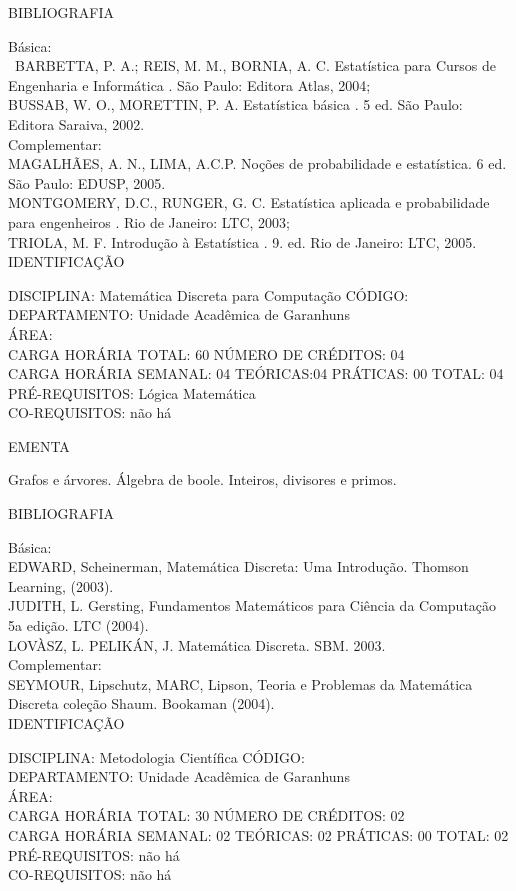 \documentclass[
	12pt,				%
	openright,			%
  oneside,     %
	a4paper,			%
	chapter=TITLE,		%
	english,			%
	french,				%
	spanish,			%
	brazil				%
	]{abntex2}
\begin{document}
\begin{apendicesenv}
BIBLIOGRAFIA 

Básica:\\\
BARBETTA, P. A.; REIS, M. M., BORNIA, A. C. Estatística para Cursos de Engenharia e Informática . São Paulo: Editora Atlas, 2004;\\
BUSSAB, W. O., MORETTIN, P. A. Estatística básica . 5 ed. São Paulo: Editora Saraiva, 2002.\\
Complementar:\\
MAGALHÃES, A. N., LIMA, A.C.P.  Noções de probabilidade e estatística. 6 ed. São Paulo: EDUSP, 2005.\\
MONTGOMERY, D.C., RUNGER, G. C. Estatística aplicada e probabilidade para engenheiros . Rio de Janeiro: LTC, 2003;\\
TRIOLA, M. F.  Introdução à Estatística . 9. ed. Rio de Janeiro: LTC, 2005.\\

\newpage IDENTIFICAÇÃO

DISCIPLINA: Matemática Discreta para Computação CÓDIGO:\\
DEPARTAMENTO: Unidade Acadêmica de Garanhuns\\
ÁREA: \\
CARGA HORÁRIA TOTAL: 60 NÚMERO DE CRÉDITOS: 04\\
CARGA HORÁRIA SEMANAL: 04 TEÓRICAS:04 PRÁTICAS: 00 TOTAL: 04\\
PRÉ-REQUISITOS: Lógica Matemática\\
CO-REQUISITOS: não há

EMENTA 

Grafos e árvores. Álgebra de boole. Inteiros, divisores e primos.

BIBLIOGRAFIA 

Básica:\\
EDWARD, Scheinerman, Matemática Discreta: Uma Introdução. Thomson
Learning, (2003).\\
JUDITH, L. Gersting, Fundamentos Matemáticos para Ciência da Computação
 5a edição. LTC (2004).\\
LOVÀSZ, L. PELIKÁN, J. Matemática Discreta. SBM. 2003.\\
Complementar:\\
SEYMOUR, Lipschutz, MARC, Lipson, Teoria e Problemas da Matemática
Discreta  coleção Shaum. Bookaman (2004).\\


\newpage IDENTIFICAÇÃO

DISCIPLINA: Metodologia Científica CÓDIGO:\\
DEPARTAMENTO: Unidade Acadêmica de Garanhuns\\
ÁREA: \\
CARGA HORÁRIA TOTAL: 30 NÚMERO DE CRÉDITOS: 02\\
CARGA HORÁRIA SEMANAL: 02 TEÓRICAS: 02 PRÁTICAS: 00 TOTAL: 02\\
PRÉ-REQUISITOS: não há\\
CO-REQUISITOS: não há


\end{apendicesenv}
\end{document}

